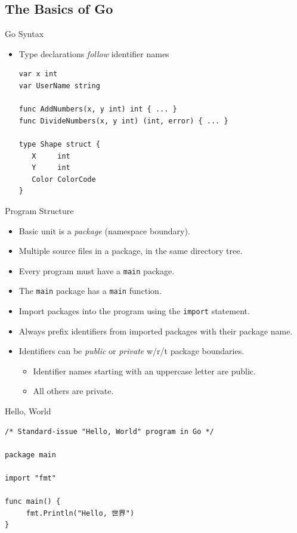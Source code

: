 \documentclass[pdf]{beamer}
\newcommand\z[1]{\texttt{#1}}
\newcommand\identifier[1]{{\color{green!70!black}\z{#1}}}
\newcommand\keyword[1]{{\color{blue}\z{#1}}}
\begin{document}
\subsection{The Basics of Go}
\begin{frame}[fragile]{Go Syntax}
	\begin{itemize}
		\item Type declarations \emph{follow} identifier names
\begin{lstlisting}
var x int
var UserName string

func AddNumbers(x, y int) int { ... }
func DivideNumbers(x, y int) (int, error) { ... }

type Shape struct {
   X     int
   Y     int
   Color ColorCode
}
\end{lstlisting}
	\end{itemize}
\end{frame}
\begin{frame}{Program Structure}
	\begin{itemize}
		\item Basic unit is a \emph{package} (namespace boundary).\pause
		\item Multiple source files in a package, in the same directory tree.\pause
		\item Every program must have a \identifier{main} package.
		\item The \identifier{main} package has a \identifier{main} function.\pause
		\item Import packages into the program using the \keyword{import} statement.
		\item Always prefix identifiers from imported packages with their package name.\pause
		\item Identifiers can be \emph{public} or \emph{private} w/r/t package boundaries.\pause
			\begin{itemize}
				\item Identifier names starting with an uppercase letter are public.
				\item All others are private.
			\end{itemize}
	\end{itemize}
\end{frame}
\begin{frame}[fragile]{Hello, World}
\begin{lstlisting}
/* Standard-issue "Hello, World" program in Go */

package main

import "fmt"

func main() {
     fmt.Println("Hello, 世界")
}
\end{lstlisting}
\end{frame}
\end{document}
